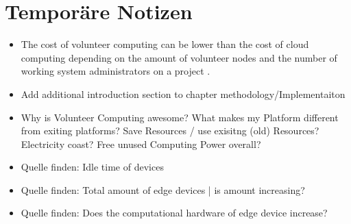 \section{Temporäre Notizen}

\begin{itemize}
    \item The cost of volunteer computing can be lower than the cost of cloud computing depending on the amount of volunteer nodes and the number of working system administrators on a project \cite{intro:costAnalysis}.
    \item Add additional introduction section to chapter methodology/Implementaiton
    \item Why is Volunteer Computing awesome? What makes my Platform different from exiting platforms? Save Resources / use exisitng (old) Resources? Electricity coast? Free unused Computing Power overall?
    \item Quelle finden: Idle time of devices
    \item Quelle finden: Total amount of edge devices | is amount increasing?
    \item Quelle finden: Does the computational hardware of edge device increase? 
\end{itemize}